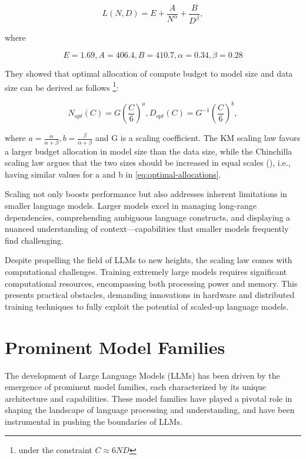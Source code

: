 \begin{enumerate}
{		      \[L(N,D) = E + \frac{A}{N^\alpha} + \frac{B}{D^\beta},\]

		      where

		      \[E=1.69, A=406.4,B = 410.7, \alpha = 0.34, \beta = 0.28\]

		      They showed that optimal allocation of compute budget to model size and data size can be derived as follows \footnote{under the constraint \(C \approx 6ND\)}:

		      \begin{center}
			      \begin{equation}
				      N_{opt}(C) = G(\frac{C}{6})^a, D_{opt}(C) = G^{-1}(\frac{C}{6})^b, \label{eq:optimal-allocations}
			      \end{equation}
		      \end{center}

		      where \(a=\frac{\alpha}{\alpha+\beta}, b=\frac{\beta}{\alpha+\beta}\) and G is a scaling coefficient.
		      The KM scaling law favors a larger budget allocation in model size than the data size, while the Chinchilla scaling law argues that the two sizes should be increased in equal scales (\textcite{hoffmann2022training}), i.e., having similar values for a and b in \eqref{eq:optimal-allocations}.
	      }
\end{enumerate}

Scaling not only boosts performance but also addresses inherent limitations in smaller language models.
Larger models excel in managing long-range dependencies, comprehending ambiguous language constructs, and displaying a nuanced understanding of context---capabilities that smaller models frequently find challenging.

Despite propelling the field of LLMs to new heights, the scaling law comes with computational challenges.
Training extremely large models requires significant computational resources, encompassing both processing power and memory.
This presents practical obstacles, demanding innovations in hardware and distributed training techniques to fully exploit the potential of scaled-up language models.


\section{Prominent Model Families}
\label{sec:promiment-model-families}

The development of Large Language Models (LLMs) has been driven by the emergence of prominent model families, each characterized by its unique architecture and capabilities.
These model families have played a pivotal role in shaping the landscape of language processing and understanding, and have been instrumental in pushing the boundaries of LLMs.


